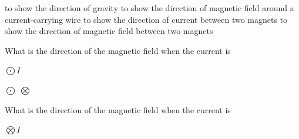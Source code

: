 \documentclass[]{exam}
\begin{document}
\begin{questions}
\begin{center}
\begin{minipage}{0.3\textwidth}
\centering
\end{minipage}%
\hspace{1em}
\end{center}

\begin{randomizechoices}
\choice to show the direction of gravity
\CorrectChoice to show the direction of magnetic field around a current-carrying wire
\choice to show the direction of current between two magnets
\choice to show the direction of magnetic field between two magnets
\end{randomizechoices}

\question
What is the direction of the magnetic field when the current is

\begin{center}
    $\bigodot I$
\end{center}

\begin{randomizechoices}
\choice {$\circlearrowright$}
\CorrectChoice {$\circlearrowleft$}
\choice $\bigodot$
\choice $\bigotimes$
\end{randomizechoices}

\clearpage
\question
What is the direction of the magnetic field when the current is

\begin{center}
    $\bigotimes I$
\end{center}


\end{questions}
\end{document}

